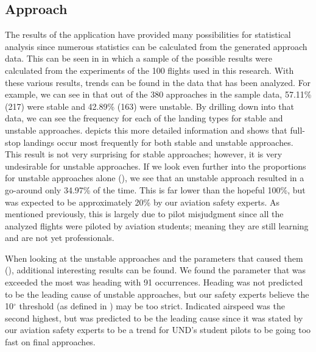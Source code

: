     \subsection{Approach}
    
    	The results of the application have provided many possibilities for statistical analysis since numerous statistics can be calculated from the generated approach data.  This can be seen in  in which a sample of the possible results were calculated from the experiments of the 100 flights used in this research.  With these various results, trends can be found in the data that has been analyzed.  For example, we can see in  that out of the 380 approaches in the sample data, 57.11\% (217) were stable and 42.89\% (163) were unstable.  By drilling down into that data, we can see the frequency for each of the landing types for stable and unstable approaches.   depicts this more detailed information and shows that full-stop landings occur most frequently for both stable and unstable approaches.  This result is not very surprising for stable approaches; however, it is very undesirable for unstable approaches.  If we look even further into the proportions for unstable approaches alone (), we see that an unstable approach resulted in a go-around only 34.97\% of the time.  This is far lower than the hopeful 100\%, but was expected to be approximately 20\% by our aviation safety experts.  As mentioned previously, this is largely due to pilot misjudgment since all the analyzed flights were piloted by aviation students; meaning they are still learning and are not yet professionals.
    
    When looking at the unstable approaches and the parameters that caused them (), additional interesting results can be found.  We found the parameter that was exceeded the most was heading with 91 occurrences.  Heading was not predicted to be the leading cause of unstable approaches, but our safety experts believe the 10$^\circ$ threshold (as defined in ) may be too strict.  Indicated airspeed was the second highest, but was predicted to be the leading cause since it was stated by our aviation safety experts to be a trend for UND's student pilots to be going too fast on final approaches.
    

